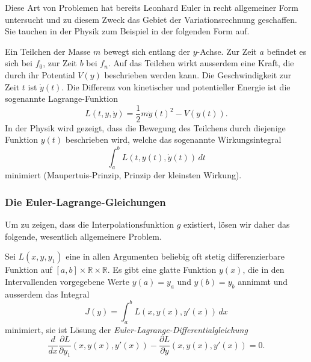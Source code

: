 Diese Art von Problemen hat bereits Leonhard Euler in recht allgemeiner
Form untersucht und zu diesem Zweck das Gebiet der Variationsrechnung
geschaffen.
%
%
%
Sie tauchen in der Physik zum Beispiel in der folgenden Form auf.
%

\begin{beispiel}
Ein Teilchen der Masse $m$ bewegt sich entlang der $y$-Achse.
%
%
Zur Zeit $a$ befindet es sich bei $f_0$, zur Zeit $b$ bei $f_n$.
Auf das Teilchen wirkt ausserdem eine Kraft, die durch ihr Potential $V(y)$
beschrieben werden kann.
%
%
Die Geschwindigkeit zur Zeit $t$ ist $\dot y(t)$.
%
Die Differenz von kinetischer und potentieller Energie ist
die sogenannte Lagrange-Funktion
%
%
%
\begin{equation}
L(t,y,\dot{y})
=
\frac12m\dot{y}(t)^2
-
V(y(t)).
\label{buch:equation:mechlagrange}
\end{equation}
In der Physik wird gezeigt, dass die Bewegung des Teilchens durch diejenige
Funktion $y(t)$ beschrieben wird, welche das sogenannte Wirkungsintegral
%
%
\[
\int_a^b L(t,y(t),\dot{y}(t))\,dt
\]
minimiert (Maupertuis-Prinzip, Prinzip der kleinsten Wirkung).
%
%
\end{beispiel}

\subsubsection{Die Euler-Lagrange-Gleichungen}
%
Um zu zeigen, dass die Interpolationsfunktion $g$ existiert, lösen
wir daher das folgende, wesentlich allgemeinere Problem.

\begin{satz}
\label{buch:satz:eulerlagrange}
Sei $L(x,y,y_1)$ eine in allen Argumenten beliebig oft stetig differenzierbare
Funktion auf $[a,b]\times \mathbb R \times \mathbb R$.
Es gibt eine glatte Funktion $y(x)$, die in den Intervallenden vorgegebene
Werte $y(a)=y_a$ und $y(b)=y_b$ annimmt und ausserdem das Integral
\[
J(y)
=
\int_a^b L(x, y(x), y'(x) ) \,dx
\]
minimiert,
sie ist Lösung der {\em Euler-Lagrange-Differentialgleichung}
\begin{equation}
\frac{d}{dx} \frac{\partial L}{\partial y_1} (x,y(x),y'(x))
-
\frac{\partial L}{\partial y} (x,y(x),y'(x))
=
0.
\label{buch:variation:eulerlagrange}
\end{equation}
\end{satz}

